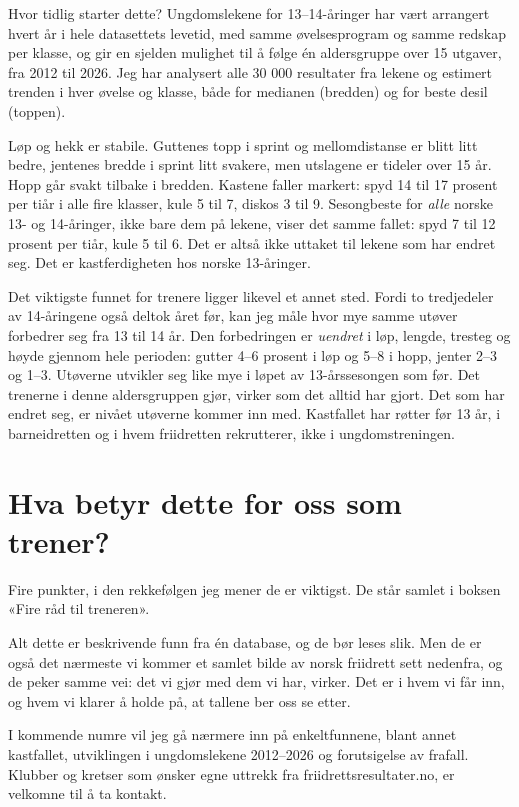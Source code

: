 Hvor tidlig starter dette? Ungdomslekene for 13--14-åringer har vært arrangert
hvert år i hele datasettets levetid, med samme øvelsesprogram og samme redskap per klasse, og
gir en sjelden mulighet til å følge én aldersgruppe over 15 utgaver, fra 2012
til 2026. Jeg har analysert alle 30 000 resultater fra lekene og estimert trenden i hver øvelse
og klasse, både for medianen (bredden) og for beste desil (toppen).

Løp og hekk er stabile. Guttenes topp i sprint og mellomdistanse er blitt
litt bedre, jentenes bredde i sprint litt svakere, men utslagene er tideler
over 15 år. Hopp går svakt tilbake i bredden. Kastene faller markert: spyd 14
til 17 prosent per tiår i alle fire klasser, kule 5 til 7, diskos 3 til 9.
Sesongbeste for \emph{alle} norske 13- og 14-åringer, ikke bare dem på lekene,
viser det samme fallet: spyd 7 til 12 prosent per tiår, kule 5 til 6. Det er altså ikke uttaket til lekene som har
endret seg. Det er kastferdigheten hos norske 13-åringer.

Det viktigste funnet for trenere ligger likevel et annet sted. Fordi to
tredjedeler av 14-åringene også deltok året før, kan jeg måle hvor mye samme
utøver forbedrer seg fra 13 til 14 år. Den forbedringen er \emph{uendret} i løp,
lengde, tresteg og høyde gjennom hele perioden: gutter 4--6 prosent i løp og 5--8 i hopp, jenter
2--3 og 1--3. Utøverne utvikler seg like mye i løpet av 13-årssesongen som
før. Det trenerne i denne aldersgruppen gjør, virker som det alltid har
gjort. Det som har endret seg, er nivået utøverne kommer inn med. Kastfallet
har røtter før 13 år, i barneidretten og i hvem friidretten rekrutterer, ikke
i ungdomstreningen.

\section{Hva betyr dette for oss som trener?}\label{hva-betyr-dette-for-oss-som-trener}

Fire punkter, i den rekkefølgen jeg mener de er viktigst. De står samlet i boksen «Fire råd til treneren».

Alt dette er beskrivende funn fra én database, og de bør leses slik. Men de
er også det nærmeste vi kommer et samlet bilde av norsk friidrett sett
nedenfra, og de peker samme vei: det vi gjør med dem vi har, virker. Det er
i hvem vi får inn, og hvem vi klarer å holde på, at tallene ber oss se etter.

I kommende numre vil jeg gå nærmere inn på enkeltfunnene, blant annet
kastfallet, utviklingen i ungdomslekene 2012--2026 og forutsigelse av frafall.
Klubber og kretser som ønsker egne uttrekk fra friidrettsresultater.no, er
velkomne til å ta kontakt.\sluttmerke

